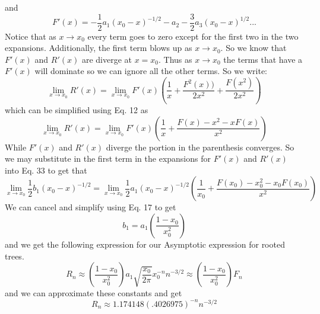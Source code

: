 \documentclass{article}
\begin{document}
and
\begin{equation}
F'(x)= -\frac{1}{2}a_1(x_0-x)^{-1/2}-a_2-\frac{3}{2}a_3(x_0-x)^{1/2}...
\end{equation}
Notice that as \(x \to x_0\) every term goes to zero except for the first two in the two expansions. Additionally, the first term blows up as \(x \to x_0\). So we know that \(F'(x)\) and \(R'(x)\) are diverge at \(x=x_0\). Thus as \(x \to x_0\) the terms that have a \(F'(x)\) will dominate so we can ignore all the other terms. So we write:
\[\lim_{x \to x_0}R'(x)=\lim_{x\to x_0} F'(x)\left(\frac{1}{x}+\frac{F^2(x))}{2x^2}+\frac{F(x^2)}{2x^2}\right)\] 
which can be simplified using Eq. 12 as 
\begin{equation}
\lim_{x \to x_0}R'(x)=\lim_{x\to x_0} F'(x)\left(\frac{1}{x}+\frac{F(x)-x^2-xF(x)}{x^2}\right)
\end{equation} 
While \(F'(x)\) and \(R'(x)\) diverge the portion in the parenthesis converges. So we may substitute in the first term in the expansions for \(F'(x)\) and \(R'(x)\) into Eq. 33 to get that 
\[\lim_{x \to x_0}\frac{1}{2}b_1(x_0-x)^{-1/2}=\lim_{x\to x_0}\frac{1}{2}a_1(x_0-x)^{-1/2}\left(\frac{1}{x_0}+\frac{F(x_0)-x_0^2-x_0F(x_0)}{x^2}\right)\]
We can cancel and simplify using Eq. 17 to get
\begin{equation}
b_1=a_1 \left(\frac{1-x_0}{x_0^2}\right)
\end{equation}
and we get the following expression for our Asymptotic expression for rooted trees. 
\begin{equation}
R_n \approx \left(\frac{1-x_0}{x_0^2}\right)a_1\sqrt{\frac{x_0}{2\pi}}x_0^{-n}n^{-3/2} \approx \left(\frac{1-x_0}{x_0^2}\right)F_n
\end{equation}
and we can approximate these constants and get 
\begin{equation}
R_n \approx 1.174148(.4026975)^{-n}n^{-3/2}
\end{equation}
\end{document}
